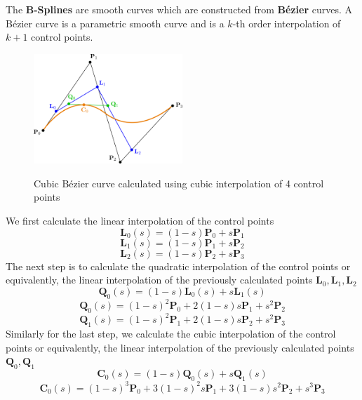 The \textbf{B-Splines} are smooth curves which are constructed from \textbf{B\'ezier} curves. A B\'ezier curve is a parametric smooth curve and is a $k$-th order interpolation of $k+1$ control points.

\begin{center}
\begin{figure}[!htb]
\centering
\includegraphics[width=0.5\textwidth]{images/bezier-curve.png}\\
\caption{Cubic B\'ezier curve calculated using cubic interpolation of 4 control points} 
\end{figure}
\end{center}

We first calculate the linear interpolation of the control points
\begin{equation}
\mathbf{L}_0(s) = (1-s)\mathbf{P}_0 + s\mathbf{P}_1
\end{equation}
\[
\mathbf{L}_1(s) = (1-s)\mathbf{P}_1 + s\mathbf{P}_2
\]
\[
\mathbf{L}_2(s) = (1-s)\mathbf{P}_2 + s\mathbf{P}_3
\]
The next step is to calculate the quadratic interpolation of the control points or equivalently, the linear interpolation of the previously calculated points $\mathbf{L}_0,\mathbf{L}_1,\mathbf{L}_2$
\[
\mathbf{Q}_0(s) = (1-s)\mathbf{L}_0(s) + s\mathbf{L}_1(s)
\]
\begin{equation}
\mathbf{Q}_0(s) = (1-s)^2\mathbf{P}_0 + 2(1-s)s\mathbf{P}_1 + s^2\mathbf{P}_2
\end{equation}
\[
\mathbf{Q}_1(s) = (1-s)^2\mathbf{P}_1 + 2(1-s)s\mathbf{P}_2 + s^2\mathbf{P}_3
\]
Similarly for the last step, we calculate the cubic interpolation of the control points or equivalently, the linear interpolation of the previously calculated points $\mathbf{Q}_0,\mathbf{Q}_1$
\[
\mathbf{C}_0(s) = (1-s)\mathbf{Q}_0(s) + s\mathbf{Q}_1(s)
\]
\begin{equation}
\mathbf{C}_0(s) = (1-s)^3\mathbf{P}_0 +3(1-s)^2 s\mathbf{P}_1 + 3(1-s)s^2\mathbf{P}_2 + s^3\mathbf{P}_3
\end{equation}

